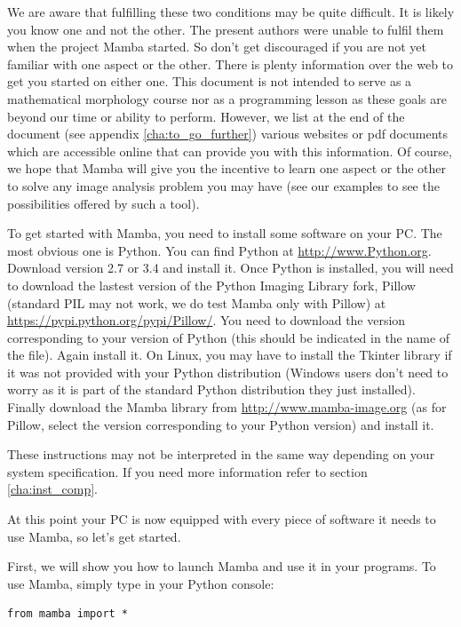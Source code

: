 \documentclass[a4paper,10pt,oneside]{article}
\begin{document}
We are aware that fulfilling these two conditions may be quite difficult. It is 
likely you know one and not the other. The present authors were unable to 
fulfil them when the project Mamba started. So don't get discouraged if you are
not yet familiar with one aspect or the other. There is plenty information over
the web to get you started on either one. This document is not intended to serve
as a mathematical morphology course nor as a programming lesson as these goals are
beyond our time or ability to perform. However, we list at the end of the
document (see appendix \ref{cha:to_go_further}) various websites or pdf documents which are 
accessible online that can provide you with this information. Of course, we hope that
Mamba will give you the incentive to learn one aspect or the other to solve
any image analysis problem you may have (see our examples to see the 
possibilities offered by such a tool).

To get started with Mamba, you need to install some software on your PC. The 
most obvious one is Python. You can find Python at \url{http://www.Python.org}. 
Download version 2.7 or 3.4 and install it. Once Python is installed, you will
need to download the lastest version of the Python Imaging Library fork, Pillow
(standard PIL may not work, we do test Mamba only with Pillow) at 
\url{https://pypi.python.org/pypi/Pillow/}.
You need to download the version corresponding to your version of Python (this
should be indicated in the name of the file). Again install it. On Linux, you may
have to install the Tkinter library if it was not provided with your Python
distribution (Windows users don't need to worry as it is part of the standard 
Python distribution they just installed). Finally download the Mamba library 
from \url{http://www.mamba-image.org} (as for Pillow, select the version corresponding
to your Python version) and install it.

These instructions may not be interpreted in the same way depending on your 
system specification. If you need more information refer to section
\ref{cha:inst_comp}.

At this point your PC is now equipped with every piece of software it needs to
use Mamba, so let's get started.

First, we will show you how to launch Mamba and use it in your programs.
To use Mamba, simply type in your Python console:

\lstset{language=Python}
\begin{lstlisting}
from mamba import * 
\end{lstlisting}
\end{document}
